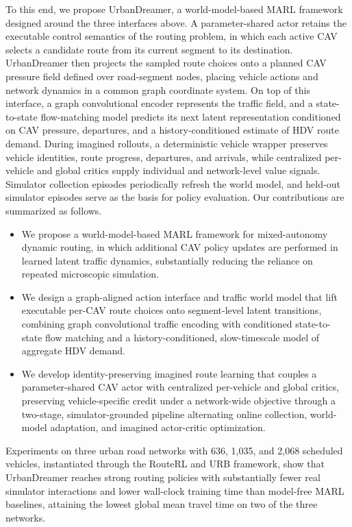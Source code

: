 To this end, we propose UrbanDreamer, a world-model-based MARL framework designed around the three interfaces above. A parameter-shared actor retains the executable control semantics of the routing problem, in which each active CAV selects a candidate route from its current segment to its destination. UrbanDreamer then projects the sampled route choices onto a planned CAV pressure field defined over road-segment nodes, placing vehicle actions and network dynamics in a common graph coordinate system. On top of this interface, a graph convolutional encoder represents the traffic field, and a state-to-state flow-matching model predicts its next latent representation conditioned on CAV pressure, departures, and a history-conditioned estimate of HDV route demand. During imagined rollouts, a deterministic vehicle wrapper preserves vehicle identities, route progress, departures, and arrivals, while centralized per-vehicle and global critics supply individual and network-level value signals. Simulator collection episodes periodically refresh the world model, and held-out simulator episodes serve as the basis for policy evaluation. Our contributions are summarized as follows.
\begin{itemize}
\item We propose a world-model-based MARL framework for mixed-autonomy dynamic routing, in which additional CAV policy updates are performed in learned latent traffic dynamics, substantially reducing the reliance on repeated microscopic simulation.
\item We design a graph-aligned action interface and traffic world model that lift executable per-CAV route choices onto segment-level latent transitions, combining graph convolutional traffic encoding with conditioned state-to-state flow matching and a history-conditioned, slow-timescale model of aggregate HDV demand.
\item We develop identity-preserving imagined route learning that couples a parameter-shared CAV actor with centralized per-vehicle and global critics, preserving vehicle-specific credit under a network-wide objective through a two-stage, simulator-grounded pipeline alternating online collection, world-model adaptation, and imagined actor-critic optimization.
\end{itemize}
Experiments on three urban road networks with 636, 1,035, and 2,068 scheduled vehicles, instantiated through the RouteRL and URB framework, show that UrbanDreamer reaches strong routing policies with substantially fewer real simulator interactions and lower wall-clock training time than model-free MARL baselines, attaining the lowest global mean travel time on two of the three networks.
